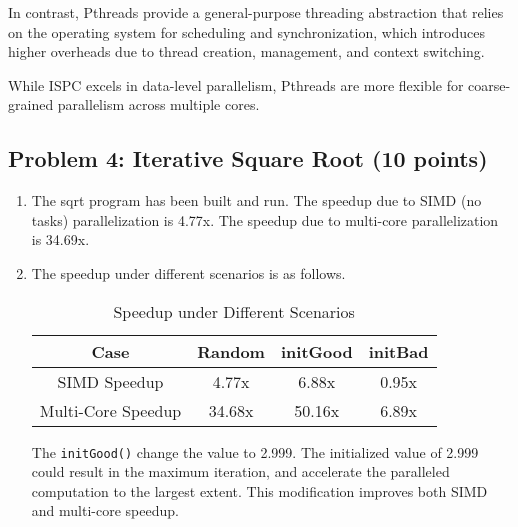 \documentclass[letterpaper,11pt]{exam}
\begin{document}
\begin{questions}
\begin{enumerate}[label=\roman*.]
\begin{itemize}
                        In contrast, Pthreads provide a general-purpose threading abstraction that relies on the operating system for scheduling and synchronization, which introduces higher overheads due to thread creation, management, and context switching.

                        While ISPC excels in data-level parallelism, Pthreads are more flexible for coarse-grained parallelism across multiple cores.
              \end{itemize}
    \end{enumerate}



    \newpage

    \question
    \subsection*{Problem 4: Iterative Square Root (10 points)}

    \begin{enumerate}[label=\roman*.]
        \item The sqrt program has been built and run. The speedup due to SIMD (no
              tasks) parallelization is 4.77x. The speedup due to multi-core parallelization
              is 34.69x.

        \item The speedup under different scenarios is as follows.

              \begin{table}[ht]
                  \centering
                  \scriptsize
                  \begin{tabular}{|c|c|c|c|}
                      \hline
                      Case               & Random & initGood & initBad \\ \hline
                      SIMD Speedup       & 4.77x  & 6.88x    & 0.95x   \\ \hline
                      Multi-Core Speedup & 34.68x & 50.16x   & 6.89x   \\ \hline
                  \end{tabular}
                  \caption{Speedup under Different Scenarios}
              \end{table}

              The \texttt{initGood()} change the value to 2.999. The initialized value of 2.999 could result in the maximum
              iteration, and accelerate the paralleled computation to the largest extent. This
              modification improves both SIMD and multi-core speedup.


\end{enumerate}
\end{questions}
\end{document}
